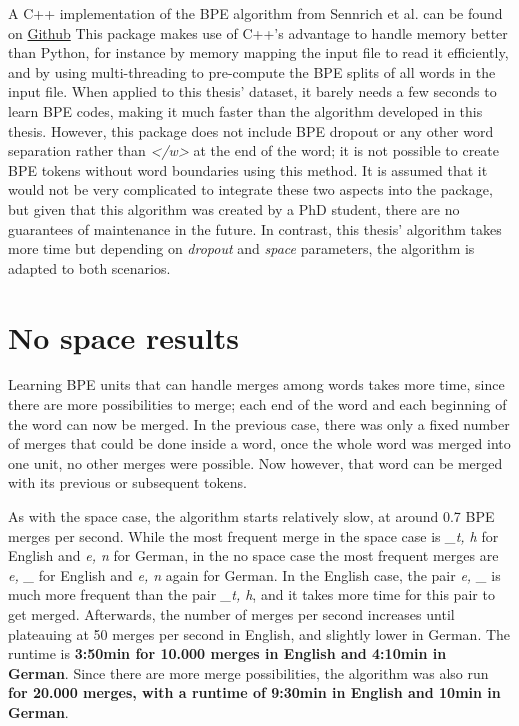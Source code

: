 A C++ implementation of the BPE algorithm from Sennrich et al. can be found on \href{https://github.com/glample/fastBPE}{Github} This package makes use of C++'s advantage to handle memory better than Python, for instance by memory mapping the input file to read it efficiently, and by using multi-threading to pre-compute the BPE splits of all words in the input file. When applied to this thesis' dataset, it barely needs a few seconds to learn BPE codes, making it much faster than the algorithm developed in this thesis. However, this package does not include BPE dropout or any other word separation rather than \emph{</w>} at the end of the word; it is not possible to create BPE tokens without word boundaries using this method. It is assumed that it would not be very complicated to integrate these two aspects into the package, but given that this algorithm was created by a PhD student, there are no guarantees of maintenance in the future. In contrast, this thesis' algorithm takes more time but depending on \emph{dropout} and \emph{space} parameters, the algorithm is adapted to both scenarios.

\section{No space results}

Learning BPE units that can handle merges among words takes more time, since there are more possibilities to merge; each end of the word and each beginning of the word can now be merged. In the previous case, there was only a fixed number of merges that could be done inside a word, once the whole word was merged into one unit, no other merges were possible. Now however, that word can be merged with its previous or subsequent tokens.

As with the space case, the algorithm starts relatively slow, at around 0.7 BPE merges per second. While the most frequent merge in the space case is \emph{\_t, h} for English and \emph{e, n} for German, in the no space case the most frequent merges are \emph{e, \_} for English and \emph{e, n} again for German. In the English case, the pair \emph{e, \_} is much more frequent than the pair \emph{\_t, h}, and it takes more time for this pair to get merged. Afterwards, the number of merges per second increases until plateauing at 50 merges per second in English, and slightly lower in German. The runtime is \textbf{3:50min for 10.000 merges in English and 4:10min in German}. Since there are more merge possibilities, the algorithm was also run \textbf{for 20.000 merges, with a runtime of 9:30min in English and 10min in German}.

